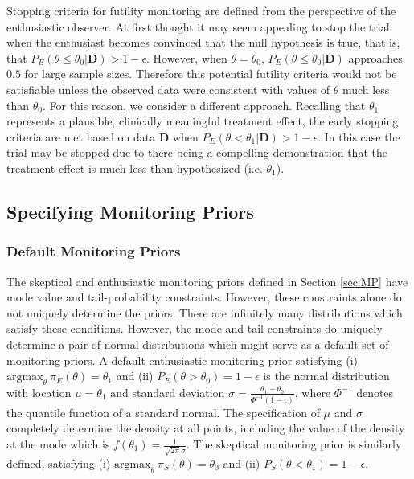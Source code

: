 \documentclass[12pt]{article}
\begin{document}
Stopping criteria for futility monitoring are defined from the perspective of the enthusiastic observer. At first thought it may seem appealing to stop the trial when the enthusiast becomes convinced that the
null hypothesis is true, that is, that $P_E(\theta\leq\theta_0|\mathbf{D})>1-\epsilon$. 
%
However, when $\theta=\theta_0$, $P_E(\theta\le\theta_0| \mathbf{D})$ approaches $0.5$ for large sample sizes. 
%
Therefore this potential futility criteria would not be satisfiable unless the observed data were consistent with values of
$\theta$ much less than $\theta_0$.
%
For this reason, we consider a different approach.
%
Recalling that $\theta_1$ represents a plausible, clinically meaningful treatment effect, the early stopping criteria are met based on data $\mathbf{D}$ when $P_E\left(\theta<\theta_1| \mathbf{D}\right)>1-\epsilon$. In this case the trial may be stopped due to there being a compelling demonstration that the treatment effect is much less than hypothesized (i.e. $\theta_1$).
%
\subsection{Specifying Monitoring Priors}\label{sec:mps}
\subsubsection{Default Monitoring Priors}\label{sec:def-mon-priors}
The skeptical and enthusiastic monitoring priors defined in Section \ref{sec:MP} have mode value and tail-probability constraints. 
%
However, these constraints alone do not uniquely determine the priors.
%
There are infinitely many distributions which satisfy these conditions.
%
However, the mode and tail constraints do uniquely determine a pair of normal distributions which might serve as a default set of monitoring priors. 
%
%
A default enthusiastic monitoring prior satisfying (i) $\text{argmax}_\theta~\pi_E(\theta)=\theta_1$
and (ii) $P_E(\theta > \theta_0)=1-\epsilon$ is the normal distribution with location $\mu=\theta_1$ and standard deviation $\sigma=\frac{\theta_1-\theta_0}{\Phi^{-1}(1-\epsilon)}$, where $\Phi^{-1}$ denotes the quantile function of a standard normal.
%
The specification of $\mu$ and $\sigma$ completely determine the density at all points, including the value of the density at the mode which is $f(\theta_1)=\frac{1}{\sqrt{2\pi}\sigma}$.
%
The skeptical monitoring prior is similarly defined, satisfying (i) $\text{argmax}_\theta~\pi_S(\theta)=\theta_0$ and (ii) $P_S(\theta < \theta_1)=1-\epsilon$.
\end{document}
